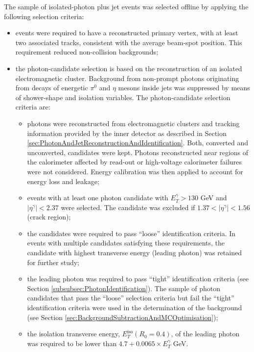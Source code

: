 \documentclass[12pt, twoside]{article}
\numberwithin{equation}{section}
\numberwithin{figure}{section}
\begin{document}
The sample of isolated-photon plus jet events was selected offline by applying the following selection criteria:
\begin{itemize}
    \item events were required to have a reconstructed primary vertex, with at least two associated tracks, consistent with the average beam-spot position. This requirement reduced non-collision backgrounds;
    \item the photon-candidate selection is based on the reconstruction of an isolated electromagnetic cluster. Background from non-prompt photons originating from decays of energetic $\pi^{0}$ and $\eta$ mesons inside jets was suppressed by means of shower-shape and isolation variables. The photon-candidate selection criteria are:
    \begin{itemize}
        \item photons were reconstructed from electromagnetic clusters and tracking information provided by the inner detector as described in Section \ref{sec:PhotonAndJetReconstructionAndIdentification}. Both, converted and unconverted, candidates were kept. Photons reconstructed near regions of the calorimeter affected by read-out or high-voltage calorimeter failures were not considered. Energy calibration was then applied to account for energy loss and leakage;
        \item events with at least one photon candidate with $E^{\gamma}_{T} > 130$ GeV and $\left| \eta^{\gamma} \right| < 2.37$ were selected. The candidate was excluded if $1.37 < \left| \eta^{\gamma} \right| < 1.56$ (crack region);
        \item the candidates were required to pass ``loose'' identification criteria. In events with multiple candidates satisfying these requirements, the candidate with highest transverse energy (leading photon) was retained for further study;
        \item the leading photon was required to pass ``tight'' identification criteria (see Section \ref{subsubsec:PhotonIdentification}). The sample of photon candidates that pass the ``loose'' selection criteria but fail the ``tight'' identification criteria were used in the determination of the background (see Section \ref{sec:BackgroundSubtractionAndMCOptimisation});
        \item the isolation transverse energy, $E^{\text{iso}}_{T} \left(R_{0} = 0.4 \right)$, of the leading photon was required to be lower than $4.7 + 0.0065 \times E^{\gamma}_{T}$ GeV.
    \end{itemize}

\end{itemize}
\end{document}
